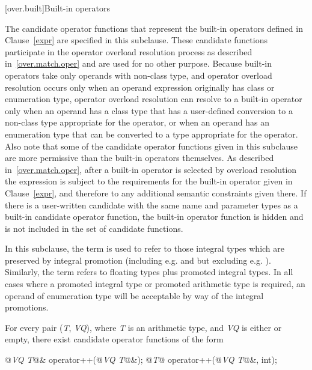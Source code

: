 [over.built]{Built-in operators}%

\pnum
The candidate operator functions that represent the built-in operators
defined in Clause~\ref{expr} are specified in this subclause.
These candidate
functions participate in the operator overload resolution process as
described in~\ref{over.match.oper} and are used for no other purpose.
\enternote
Because built-in operators take only operands with non-class type,
and operator overload resolution occurs only when an operand expression
originally has class or enumeration type,
operator overload resolution can resolve to a built-in operator only
when an operand has a class type that has a user-defined conversion to
a non-class type appropriate for the operator, or when an operand has
an enumeration type that can be converted to a type appropriate
for the operator.
Also note that some of the candidate operator functions given in this subclause are
more permissive than the built-in operators themselves.
As
described in~\ref{over.match.oper}, after a built-in operator is selected
by overload resolution the expression is subject to the requirements for
the built-in operator given in Clause~\ref{expr}, and therefore to any
additional semantic constraints given there.
If there is a user-written
candidate with the same name and parameter types as a built-in
candidate operator function, the built-in operator function
is hidden and is not included in the set of candidate functions.
\exitnote

\pnum
In this subclause, the term
is used to refer to those integral types which are preserved by
integral promotion (including e.g.
and
but excluding e.g.
).
Similarly, the term
refers to floating types plus promoted integral types.
\enternote
In all cases where a promoted integral type or promoted arithmetic type is
required, an operand of enumeration type will be acceptable by way of the
integral promotions.
\exitnote

\pnum
For every pair
(\textit{T},
\textit{VQ}),
where
\textit{T}
is an arithmetic type, and
\textit{VQ}
is either
or empty,
there exist candidate operator functions of the form

\begin{codeblock}
@\textit{VQ T}@& operator++(@\textit{VQ T}@&);
@\textit{T}@ operator++(@\textit{VQ T}@&, int);
\end{codeblock}

